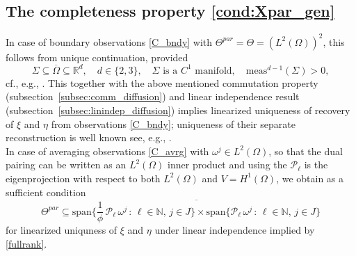 \documentclass[12pt]{article}
\newcommand\BB{\mathcal{B}}
\newcommand\Proj{\mathcal{P}}
\newcommand\coilsens{\omega}
\newcommand\pot{\xi}
\newcommand\init{\eta}
\begin{document}
\subsection{The completeness property \eqref{cond:Xpar_gen}} \label{subsec:comp_diffusion}
In case of boundary observations \eqref{C_bndy} with $\Theta^{par}=\Theta=(L^2(\Omega))^2$, this follows from unique continuation, provided 
\begin{equation}\label{uniqueconinuation}
\Sigma\subseteq\overline{\Omega}\subseteq\mathbb{R}^d, \quad d\in\{2,3\}, \quad 
\Sigma\text{ is a $C^1$ manifold}, \quad \text{meas}^{d-1}(\Sigma)>0,
\end{equation}
cf., e.g., \cite{JiangLiPauronYamamoto2023,nonlinear_imaging_JMGT_freq,Tolsa:2023}.
This together with the above mentioned commutation property (subsection~\ref{subsec:comm_diffusion}) and linear independence result  
(subsection~\ref{subsec:linindep_diffusion}) 
implies linearized uniqueness of recovery of $\pot$ and $\init$ from observations \eqref{C_bndy}; uniqueness of their separate reconstruction is well known 
see, e.g., \cite{Isakov:2006}.
\\
In case of averaging observations \eqref{C_avrg} with $\coilsens^j\in L^2(\Omega)$, so that the dual pairing can be written as an $L^2(\Omega)$ inner product and using the $\Proj_\ell$ is the eigenprojection with respect to both $L^2(\Omega)$ and $V=H^1(\Omega)$, we obtain as a sufficient condition 
\begin{equation}\label{Thetapar_pot}
\Theta^{par}\subseteq\overline{\text{span}\{\frac{1}{\phi}\,\Proj_\ell\,\coilsens^j\, : \, \ell\in\mathbb{N}, \, j\in J\}\times\text{span}\{\Proj_\ell\,\coilsens^j\, : \, \ell\in\mathbb{N}, \, j\in J\}}
\end{equation}
for linearized uniquness of $\pot$ and $\init$ under linear independence implied by \eqref{fullrank}. 
\end{document}
